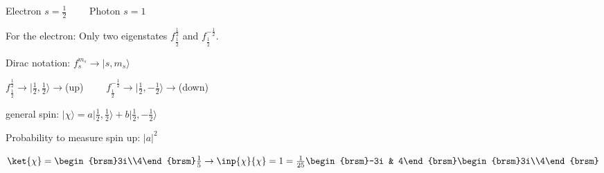 \documentclass[10pt,a4paper]{scrartcl}
\begin{document}
\begin{multicols*}{3}
	
	
	
	Electron \dahe $s=\frac{1}{2}\qquad$ Photon \dahe $s=1$
	
	For the electron: Only two eigenstates $f_\frac{1}{2}^{\frac{1}{2}}$ and $f_{\frac{1}{2}}^{-\frac{1}{2}}$.
	
	\finn
	
	Dirac notation: $f_s^{m_s}\rightarrow|s,m_s\rangle$
	
	$ f_{\frac{1}{2}}^\frac{1}{2}\rightarrow |\frac{1}{2},\frac{1}{2}\rangle\rightarrow$(up) $\qquad f_{\frac{1}{2}}^{-\frac{1}{2}}\rightarrow |\frac{1}{2},-\frac{1}{2}\rangle\rightarrow$(down)	
	
	general spin: $|\chi\rangle=a|\frac{1}{2},\frac{1}{2}\rangle + b |\frac{1}{2},-\frac{1}{2}\rangle$
	
	
	
	Probability to measure spin up: $|a|^2$	
	
	$\ket{\chi}=\begin{brsm}3i\\4\end{brsm}\frac{1}{5}\rightarrow \inp{\chi}{\chi}=1=\frac{1}{25}\begin{brsm}-3i & 4\end{brsm}\begin{brsm}3i\\4\end{brsm}$
	

\end{multicols*}
\end{document}
